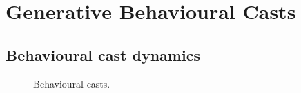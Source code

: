 \documentclass[acmlarge, anonymous, authordraft]{acmart}
\begin{document}
\begin{mathpar}
\end{mathpar}

\section{Generative Behavioural Casts}

\subsection{Behavioural cast dynamics}

\begin{figure}[!ht]
\vspace{-2mm}

{  
  \begin{mathpar}
  

\end{mathpar}}  

\vspace{-2mm}
\caption{Behavioural casts.}\label{behaves}
\end{figure}
\end{document}
